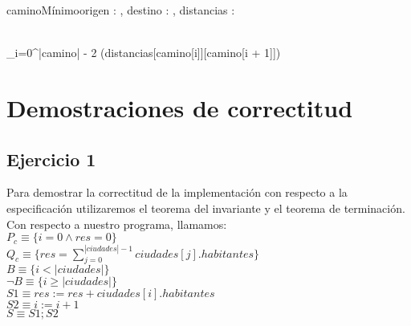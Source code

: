 \documentclass[10pt,a4paper]{article}
\begin{document}
\begin{proc}{caminoM\'inimo}{\In origen : \ent, \In destino : \ent, \In distancias : \TLista{\TLista{\ent}}}{\TLista{\ent}}
	
	\vspace{0.3cm}

	{\\ \sum\nolimits_{i=0}^{|camino| - 2} (distancias[camino[i]][camino[i + 1]])}
	
\end{proc}

\section{Demostraciones de correctitud}
\subsection{Ejercicio 1}
Para demostrar la correctitud de la implementaci\'on con respecto a la especificaci\'on utilizaremos
el teorema del invariante y el teorema de terminaci\'on. Con respecto a nuestro programa, llamamos:
\vspace{0.3cm}\\
$P_{c} \equiv \{i = 0 \land res = 0\}$\\
$Q_{c} \equiv \{res = \sum\nolimits_{j=0}^{|ciudades| - 1} ciudades[j].habitantes\}$\\
$B \equiv \{i < |ciudades|\}$\\
$\neg B \equiv \{i \ge |ciudades|\}$\\
$S1 \equiv res := res + ciudades[i].habitantes$\\
$S2 \equiv i := i + 1$\\
$S \equiv S1; S2$
\vspace{0.3cm}
\end{document}

